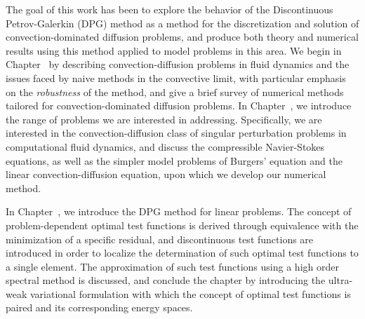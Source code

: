 The goal of this work has been to explore the behavior of the Discontinuous Petrov-Galerkin (DPG) method as a method for the discretization and solution of convection-dominated diffusion problems, and produce both theory and numerical results using this method applied to model problems in this area.  We begin in Chapter~ by describing convection-diffusion problems in fluid dynamics and the issues faced by naive methods in the convective limit, with particular emphasis on the \textit{robustness} of the method, and give a brief survey of numerical methods tailored for convection-dominated diffusion problems.  In Chapter~, we introduce the range of problems we are interested in addressing.  Specifically, we are interested in the convection-diffusion class of singular perturbation problems in computational fluid dynamics, and discuss the compressible Navier-Stokes equations, as well as the simpler model problems of Burgers' equation and the linear convection-diffusion equation, upon which we develop our numerical method.

In Chapter~, we introduce the DPG method for linear problems.  The concept of problem-dependent optimal test functions is derived through equivalence with the minimization of a specific residual, and discontinuous test functions are introduced in order to localize the determination of such optimal test functions to a single element.  The approximation of such test functions using a high order spectral method is discussed, and conclude the chapter by introducing the ultra-weak variational formulation with which the concept of optimal test functions is paired and its corresponding energy spaces.  

